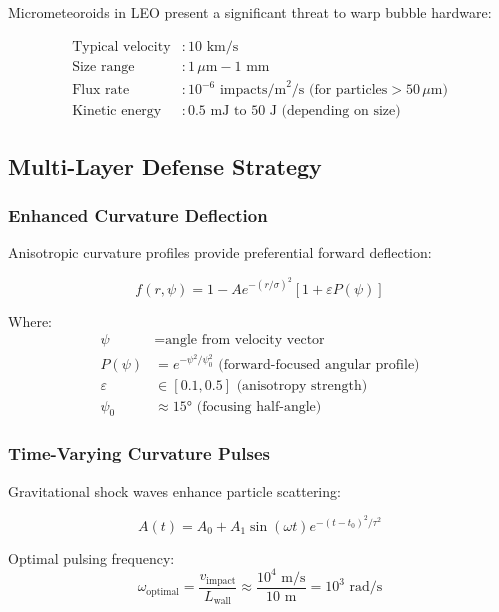 \documentclass[12pt,a4paper]{article}
\begin{document}
Micrometeoroids in LEO present a significant threat to warp bubble hardware:

\begin{align}
\text{Typical velocity} &: 10 \text{ km/s} \\
\text{Size range} &: 1\,\mu\text{m} - 1\text{ mm} \\
\text{Flux rate} &: 10^{-6} \text{ impacts/m}^2\text{/s (for particles} > 50\,\mu\text{m)} \\
\text{Kinetic energy} &: 0.5 \text{ mJ to 50 J (depending on size)}
\end{align}

\subsection{Multi-Layer Defense Strategy}

\subsubsection{Enhanced Curvature Deflection}

Anisotropic curvature profiles provide preferential forward deflection:

\begin{equation}
f(r,\psi) = 1 - A e^{-(r/\sigma)^2} [1 + \varepsilon P(\psi)]
\end{equation}

Where:
\begin{align}
\psi &= \text{angle from velocity vector} \\
P(\psi) &= e^{-\psi^2/\psi_0^2} \text{ (forward-focused angular profile)} \\
\varepsilon &\in [0.1, 0.5] \text{ (anisotropy strength)} \\
\psi_0 &\approx 15° \text{ (focusing half-angle)}
\end{align}

\subsubsection{Time-Varying Curvature Pulses}

Gravitational shock waves enhance particle scattering:

\begin{equation}
A(t) = A_0 + A_1 \sin(\omega t) e^{-(t-t_0)^2/\tau^2}
\end{equation}

Optimal pulsing frequency:
\begin{equation}
\omega_{\text{optimal}} = \frac{v_{\text{impact}}}{L_{\text{wall}}} \approx \frac{10^4 \text{ m/s}}{10 \text{ m}} = 10^3 \text{ rad/s}
\end{equation}
\end{document}
